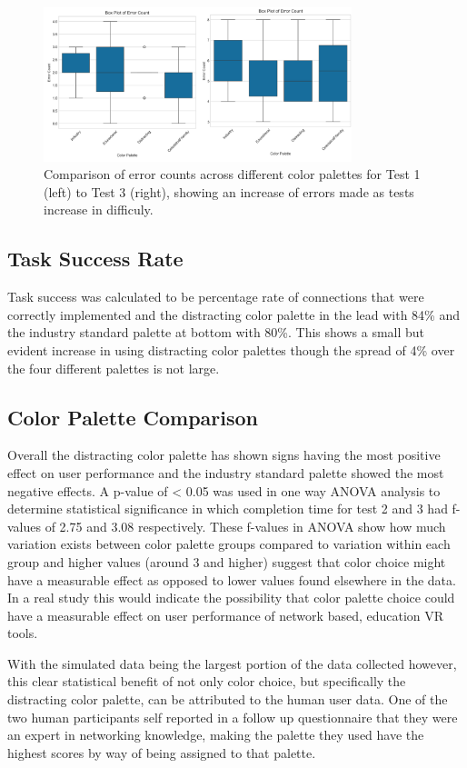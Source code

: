 \documentclass[acmlarge]{acmart}
\begin{document}
\begin{figure} [H]
  \centering
  \includegraphics[width=0.8\textwidth]{errorcounttest1and3.png}
  \caption{Comparison of error counts across different color palettes for Test 1 (left) to Test 3 (right), showing an increase of errors made as tests increase in difficuly.}
  \label{fig:errorcounttest1and3}
\end{figure}

\subsection{Task Success Rate}
Task success was calculated to be percentage rate of connections that were correctly implemented and the distracting color palette in the lead with 84\% and the industry standard palette at bottom with 80\%. This shows a small but evident increase in using distracting color palettes though the spread of 4\% over the four different palettes is not large. 

\subsection{Color Palette Comparison}
Overall the distracting color palette has shown signs having the most positive effect on user performance and the industry standard palette showed the most negative effects. A p-value of < 0.05 was used in one way ANOVA analysis to determine statistical significance in which completion time for test 2 and 3 had f-values of 2.75 and 3.08 respectively. These f-values in ANOVA show how much variation exists between color palette groups compared to variation within each group and higher values (around 3 and higher) suggest that color choice might have a measurable effect as opposed to lower values found elsewhere in the data. In a real study this would indicate the possibility that color palette choice could have a measurable effect on user performance of network based, education VR tools.

With the simulated data being the largest portion of the data collected however, this clear statistical benefit of not only color choice, but specifically the distracting color palette, can be attributed to the human user data. One of the two human participants self reported in a follow up questionnaire that they were an expert in networking knowledge, making the palette they used have the highest scores by way of being assigned to that palette. 
\end{document}
